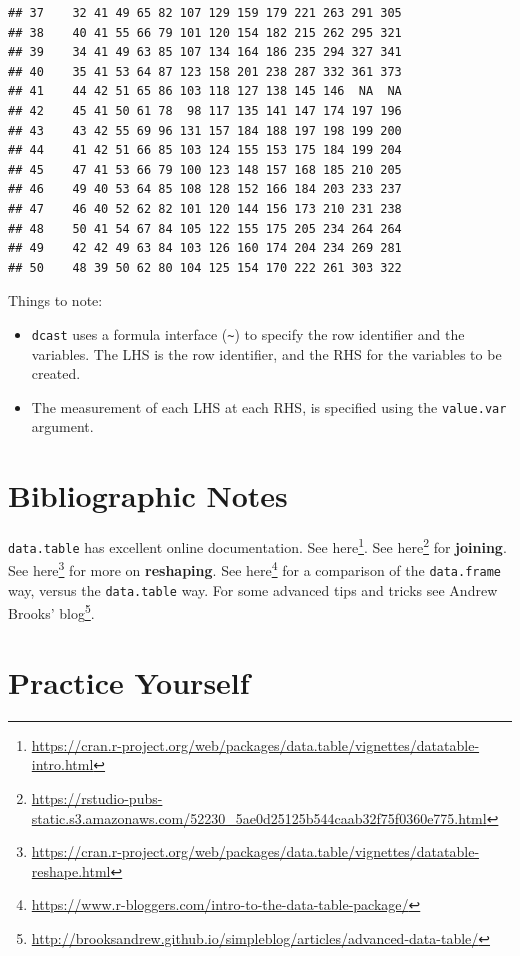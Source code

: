 \documentclass[]{book}
\providecommand{\tightlist}{%
  \setlength{\itemsep}{0pt}\setlength{\parskip}{0pt}}
\renewcommand{\href}[2]{#2\footnote{\url{#1}}}
\theoremstyle{definition}
\theoremstyle{definition}
\theoremstyle{definition}
\theoremstyle{remark}
\begin{document}
\begin{verbatim}
## 37    32 41 49 65 82 107 129 159 179 221 263 291 305
## 38    40 41 55 66 79 101 120 154 182 215 262 295 321
## 39    34 41 49 63 85 107 134 164 186 235 294 327 341
## 40    35 41 53 64 87 123 158 201 238 287 332 361 373
## 41    44 42 51 65 86 103 118 127 138 145 146  NA  NA
## 42    45 41 50 61 78  98 117 135 141 147 174 197 196
## 43    43 42 55 69 96 131 157 184 188 197 198 199 200
## 44    41 42 51 66 85 103 124 155 153 175 184 199 204
## 45    47 41 53 66 79 100 123 148 157 168 185 210 205
## 46    49 40 53 64 85 108 128 152 166 184 203 233 237
## 47    46 40 52 62 82 101 120 144 156 173 210 231 238
## 48    50 41 54 67 84 105 122 155 175 205 234 264 264
## 49    42 42 49 63 84 103 126 160 174 204 234 269 281
## 50    48 39 50 62 80 104 125 154 170 222 261 303 322
\end{verbatim}

Things to note:

\begin{itemize}
\tightlist
\item
  \texttt{dcast} uses a formula interface (\texttt{\textasciitilde{}}) to specify the row identifier and the variables. The LHS is the row identifier, and the RHS for the variables to be created.
\item
  The measurement of each LHS at each RHS, is specified using the \texttt{value.var} argument.
\end{itemize}

\hypertarget{bibliographic-notes-2}{%
\section{Bibliographic Notes}\label{bibliographic-notes-2}}

\texttt{data.table} has excellent online documentation.
See \href{https://cran.r-project.org/web/packages/data.table/vignettes/datatable-intro.html}{here}.
See \href{https://rstudio-pubs-static.s3.amazonaws.com/52230_5ae0d25125b544caab32f75f0360e775.html}{here} for \textbf{joining}.
See \href{https://cran.r-project.org/web/packages/data.table/vignettes/datatable-reshape.html}{here} for more on \textbf{reshaping}.
See \href{https://www.r-bloggers.com/intro-to-the-data-table-package/}{here} for a comparison of the \texttt{data.frame} way, versus the \texttt{data.table} way.
For some advanced tips and tricks see \href{http://brooksandrew.github.io/simpleblog/articles/advanced-data-table/}{Andrew Brooks' blog}.

\hypertarget{practice-yourself-1}{%
\section{Practice Yourself}\label{practice-yourself-1}}
\end{document}
